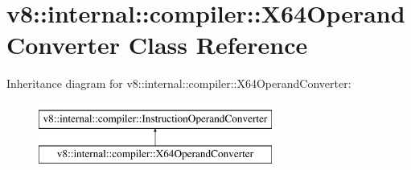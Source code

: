 \hypertarget{classv8_1_1internal_1_1compiler_1_1X64OperandConverter}{}\section{v8\+:\+:internal\+:\+:compiler\+:\+:X64\+Operand\+Converter Class Reference}
\label{classv8_1_1internal_1_1compiler_1_1X64OperandConverter}
Inheritance diagram for v8\+:\+:internal\+:\+:compiler\+:\+:X64\+Operand\+Converter\+:\begin{figure}[H]
\begin{center}
\leavevmode
\includegraphics[height=2.000000cm]{classv8_1_1internal_1_1compiler_1_1X64OperandConverter}
\end{center}
\end{figure}
